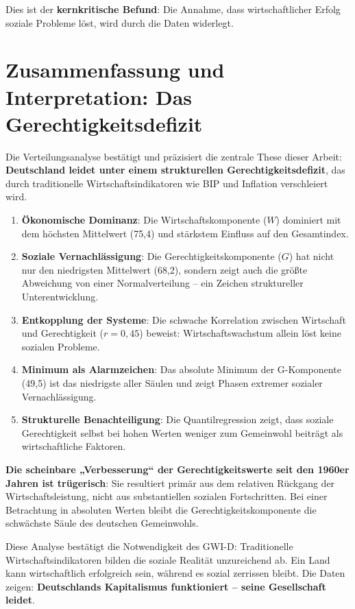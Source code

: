 Dies ist der \textbf{kernkritische Befund}: Die Annahme, dass wirtschaftlicher Erfolg soziale Probleme löst, wird durch die Daten widerlegt.

\section{Zusammenfassung und Interpretation: Das Gerechtigkeitsdefizit}

Die Verteilungsanalyse bestätigt und präzisiert die zentrale These dieser Arbeit: \textbf{Deutschland leidet unter einem strukturellen Gerechtigkeitsdefizit}, das durch traditionelle Wirtschaftsindikatoren wie BIP und Inflation verschleiert wird.

\begin{enumerate}
	\item \textbf{Ökonomische Dominanz}: Die Wirtschaftskomponente (\(W\)) dominiert mit dem höchsten Mittelwert (75,4) und stärkstem Einfluss auf den Gesamtindex.
	\item \textbf{Soziale Vernachlässigung}: Die Gerechtigkeitskomponente (\(G\)) hat nicht nur den niedrigsten Mittelwert (68,2), sondern zeigt auch die größte Abweichung von einer Normalverteilung – ein Zeichen struktureller Unterentwicklung.
	\item \textbf{Entkopplung der Systeme}: Die schwache Korrelation zwischen Wirtschaft und Gerechtigkeit (\(r = 0{,}45\)) beweist: Wirtschaftswachstum allein löst keine sozialen Probleme.
	\item \textbf{Minimum als Alarmzeichen}: Das absolute Minimum der G-Komponente (49,5) ist das niedrigste aller Säulen und zeigt Phasen extremer sozialer Vernachlässigung.
	\item \textbf{Strukturelle Benachteiligung}: Die Quantilregression zeigt, dass soziale Gerechtigkeit selbst bei hohen Werten weniger zum Gemeinwohl beiträgt als wirtschaftliche Faktoren.
\end{enumerate}

\textbf{Die scheinbare „Verbesserung“ der Gerechtigkeitswerte seit den 1960er Jahren ist trügerisch}: Sie resultiert primär aus dem relativen Rückgang der Wirtschaftsleistung, nicht aus substantiellen sozialen Fortschritten. Bei einer Betrachtung in absoluten Werten bleibt die Gerechtigkeitskomponente die schwächste Säule des deutschen Gemeinwohls.

Diese Analyse bestätigt die Notwendigkeit des GWI-D: Traditionelle Wirtschaftsindikatoren bilden die soziale Realität unzureichend ab. Ein Land kann
wirtschaftlich erfolgreich sein, während es sozial zerrissen bleibt. Die Daten zeigen:
\textbf{Deutschlands Kapitalismus funktioniert – seine Gesellschaft leidet}.

\endinput